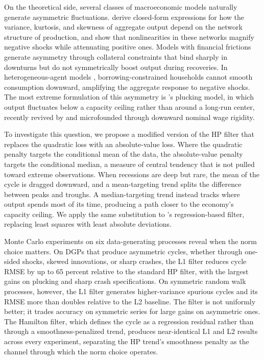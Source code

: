 \documentclass[10pt]{article}
\begin{document}
On the theoretical side, several classes of macroeconomic models naturally generate asymmetric fluctuations. \citet{acemoglu_etal2012} derive closed-form expressions for how the variance, kurtosis, and skewness of aggregate output depend on the network structure of production, and \citet{baqaee_farhi2019} show that nonlinearities in these networks magnify negative shocks while attenuating positive ones. Models with financial frictions \citep{bernanke_etal1999, kiyotaki_moore1997} generate asymmetry through collateral constraints that bind sharply in downturns but do not symmetrically boost output during recoveries. In heterogeneous-agent models \citep{kaplan_etal2018, auclert_etal2020}, borrowing-constrained households cannot smooth consumption downward, amplifying the aggregate response to negative shocks. The most extreme formulation of this asymmetry is \citet{friedman1964}'s plucking model, in which output fluctuates below a capacity ceiling rather than around a long-run center, recently revived by \citet{dupraz_etal2020} and microfounded through downward nominal wage rigidity.

To investigate this question, we propose a modified version of the HP filter that replaces the quadratic loss with an absolute-value loss. Where the quadratic penalty targets the conditional mean of the data, the absolute-value penalty targets the conditional median, a measure of central tendency that is not pulled toward extreme observations. When recessions are deep but rare, the mean of the cycle is dragged downward, and a mean-targeting trend splits the difference between peaks and troughs. A median-targeting trend instead tracks where output spends most of its time, producing a path closer to the economy's capacity ceiling. We apply the same substitution to \citet{hamilton2018}'s regression-based filter, replacing least squares with least absolute deviations.

Monte Carlo experiments on six data-generating processes reveal when the norm choice matters. On DGPs that produce asymmetric cycles, whether through one-sided shocks, skewed innovations, or sharp crashes, the L1 filter reduces cycle RMSE by up to 65 percent relative to the standard HP filter, with the largest gains on plucking and sharp crash specifications. On symmetric random walk processes, however, the L1 filter generates higher-variance spurious cycles and its RMSE more than doubles relative to the L2 baseline. The filter is not uniformly better; it trades accuracy on symmetric series for large gains on asymmetric ones. The Hamilton filter, which defines the cycle as a regression residual rather than through a smoothness-penalized trend, produces near-identical L1 and L2 results across every experiment, separating the HP trend's smoothness penalty as the channel through which the norm choice operates.
\end{document}
